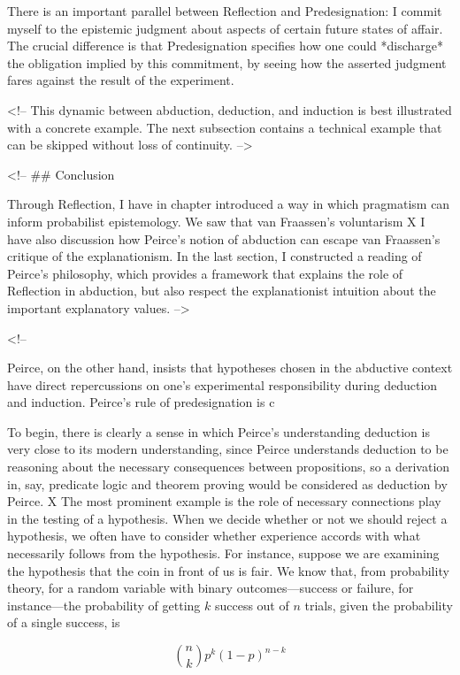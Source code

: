 There is an important parallel between Reflection and Predesignation: I
commit myself to the epistemic judgment about aspects of certain future
states of affair. The crucial difference is that Predesignation
specifies how one could *discharge* the obligation implied by this
commitment, by seeing how the asserted judgment fares against the result
of the experiment.

\textless{}!-- This dynamic between abduction, deduction, and induction
is best illustrated with a concrete example. The next subsection
contains a technical example that can be skipped without loss of
continuity. --\textgreater{}

\textless{}!-- \#\# Conclusion

Through Reflection, I have in chapter introduced a way in which
pragmatism can inform probabilist epistemology. We saw that van
Fraassen's voluntarism X I have also discussion how Peirce's notion of
abduction can escape van Fraassen's critique of the explanationism. In
the last section, I constructed a reading of Peirce's philosophy, which
provides a framework that explains the role of Reflection in abduction,
but also respect the explanationist intuition about the important
explanatory values. --\textgreater{}

\textless{}!--

Peirce, on the other hand, insists that hypotheses chosen in the
abductive context have direct repercussions on one's experimental
responsibility during deduction and induction. Peirce's rule of
predesignation is c

To begin, there is clearly a sense in which Peirce's understanding
deduction is very close to its modern understanding, since Peirce
understands deduction to be reasoning about the necessary consequences
between propositions, so a derivation in, say, predicate logic and
theorem proving would be considered as deduction by Peirce. X The most
prominent example is the role of necessary connections play in the
testing of a hypothesis. When we decide whether or not we should reject
a hypothesis, we often have to consider whether experience accords with
what necessarily follows from the hypothesis. For instance, suppose we
are examining the hypothesis that the coin in front of us is fair. We
know that, from probability theory, for a random variable with binary
outcomes---success or failure, for instance---the probability of getting
\(k\) success out of \(n\) trials, given the probability of a single
success, is

\[{n \choose k} p^k (1-p)^{n-k}\]

